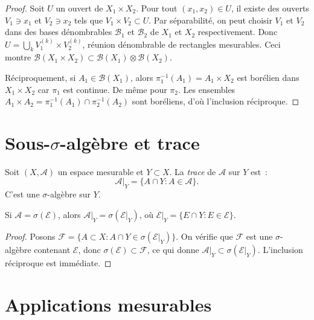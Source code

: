 \begin{proof}
Soit $U$ un ouvert de $X_1 \times X_2$. Pour tout $(x_1, x_2) \in U$, il existe
des ouverts $V_1 \ni x_1$ et $V_2 \ni x_2$ tels que $V_1 \times V_2 \subset U$.
Par s\'eparabilit\'e, on peut choisir $V_1$ et $V_2$ dans des bases d\'enombrables
$\mathcal{B}_1$ et $\mathcal{B}_2$ de $X_1$ et $X_2$ respectivement. Donc
$U = \bigcup_{k} V_1^{(k)} \times V_2^{(k)}$, r\'eunion d\'enombrable de rectangles
mesurables. Ceci montre $\mathcal{B}(X_1 \times X_2) \subset
\mathcal{B}(X_1) \otimes \mathcal{B}(X_2)$.

R\'eciproquement, si $A_1 \in \mathcal{B}(X_1)$, alors $\pi_1^{-1}(A_1) =
A_1 \times X_2$ est bor\'elien dans $X_1 \times X_2$ car $\pi_1$ est continue.
De m\^eme pour $\pi_2$. Les ensembles $A_1 \times A_2 = \pi_1^{-1}(A_1) \cap
\pi_2^{-1}(A_2)$ sont bor\'eliens, d'o\`u l'inclusion r\'eciproque.
\end{proof}

\section{Sous-$\sigma$-alg\`ebre et trace}

\begin{definition}[Trace]
Soit $(X, \mathcal{A})$ un espace mesurable et $Y \subset X$. La \emph{trace} de
$\mathcal{A}$ sur $Y$ est~:
\[
\mathcal{A}|_Y = \{A \cap Y : A \in \mathcal{A}\}.
\]
C'est une $\sigma$-alg\`ebre sur $Y$.
\end{definition}

\begin{proposition}
Si $\mathcal{A} = \sigma(\mathcal{E})$, alors
$\mathcal{A}|_Y = \sigma(\mathcal{E}|_Y)$, o\`u
$\mathcal{E}|_Y = \{E \cap Y : E \in \mathcal{E}\}$.
\end{proposition}

\begin{proof}
Posons $\mathcal{F} = \{A \subset X : A \cap Y \in \sigma(\mathcal{E}|_Y)\}$.
On v\'erifie que $\mathcal{F}$ est une $\sigma$-alg\`ebre contenant $\mathcal{E}$,
donc $\sigma(\mathcal{E}) \subset \mathcal{F}$, ce qui donne
$\mathcal{A}|_Y \subset \sigma(\mathcal{E}|_Y)$. L'inclusion r\'eciproque est
imm\'ediate.
\end{proof}

\section{Applications mesurables}

